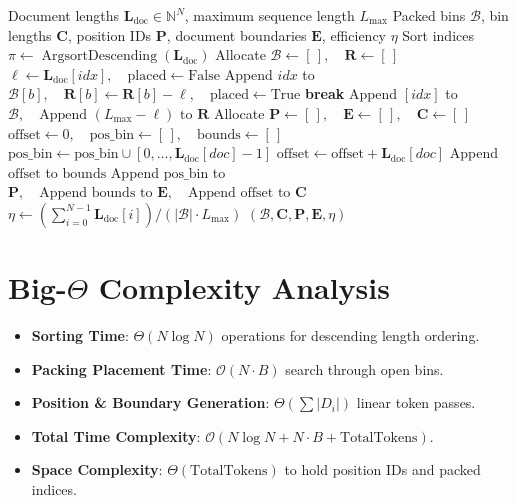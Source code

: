 \documentclass[11pt,a4paper]{article}
\theoremstyle{definition}
\begin{document}
\begin{algorithm}[H]
\caption{Sequence Packing via First-Fit Decreasing and Boundary Generation}
\begin{algorithmic}[1]
\Require Document lengths $\mathbf{L}_{\text{doc}} \in \mathbb{N}^N$, maximum sequence length $L_{\max}$
\Ensure Packed bins $\mathcal{B}$, bin lengths $\mathbf{C}$, position IDs $\mathbf{P}$, document boundaries $\mathbf{E}$, efficiency $\eta$
\State Sort indices $\pi \gets \operatorname{ArgsortDescending}(\mathbf{L}_{\text{doc}})$
\State Allocate $\mathcal{B} \gets [\,], \quad \mathbf{R} \gets [\,]$ 
    \State $\ell \gets \mathbf{L}_{\text{doc}}[idx], \quad \text{placed} \gets \text{False}$
            \State Append $idx$ to $\mathcal{B}[b], \quad \mathbf{R}[b] \gets \mathbf{R}[b] - \ell, \quad \text{placed} \gets \text{True}$
            \State \textbf{break}
        \EndIf
    \EndFor
        \State Append $[idx]$ to $\mathcal{B}, \quad \text{Append } (L_{\max} - \ell) \text{ to } \mathbf{R}$
    \EndIf
\EndFor
\State Allocate $\mathbf{P} \gets [\,], \quad \mathbf{E} \gets [\,], \quad \mathbf{C} \gets [\,]$
    \State $\text{offset} \gets 0, \quad \text{pos\_bin} \gets [\,], \quad \text{bounds} \gets [\,]$
        \State $\text{pos\_bin} \gets \text{pos\_bin} \cup [0, \dots, \mathbf{L}_{\text{doc}}[doc] - 1]$
        \State $\text{offset} \gets \text{offset} + \mathbf{L}_{\text{doc}}[doc]$
        \State Append $\text{offset}$ to $\text{bounds}$
    \EndFor
    \State Append $\text{pos\_bin}$ to $\mathbf{P}, \quad \text{Append } \text{bounds to } \mathbf{E}, \quad \text{Append } \text{offset to } \mathbf{C}$
\EndFor
\State $\eta \gets \left( \sum_{i=0}^{N-1} \mathbf{L}_{\text{doc}}[i] \right) / (|\mathcal{B}| \cdot L_{\max})$
\State \Return $(\mathcal{B}, \mathbf{C}, \mathbf{P}, \mathbf{E}, \eta)$
\end{algorithmic}
\end{algorithm}

\section{Big-$\Theta$ Complexity Analysis}

\begin{itemize}
    \item \textbf{Sorting Time}: $\Theta(N \log N)$ operations for descending length ordering.
    \item \textbf{Packing Placement Time}: $\mathcal{O}(N \cdot B)$ search through open bins.
    \item \textbf{Position \& Boundary Generation}: $\Theta(\sum |D_i|)$ linear token passes.
    \item \textbf{Total Time Complexity}: $\mathcal{O}(N \log N + N \cdot B + \text{TotalTokens})$.
    \item \textbf{Space Complexity}: $\Theta(\text{TotalTokens})$ to hold position IDs and packed indices.
\end{itemize}
\end{document}
